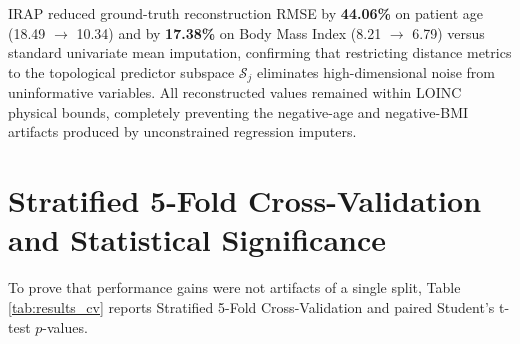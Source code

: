 \documentclass[MTech]{ugthesis}
\begin{document}
\begin{table}[htpb]
\small
\centering
\renewcommand{\arraystretch}{1.3}
\caption{Imputation fidelity evaluation measuring ground-truth reconstruction RMSE.}
\label{tab:results_imputation}
\end{table}

IRAP reduced ground-truth reconstruction RMSE by \textbf{44.06\%} on patient age (18.49 $\to$ 10.34) and by \textbf{17.38\%} on Body Mass Index (8.21 $\to$ 6.79) versus standard univariate mean imputation, confirming that restricting distance metrics to the topological predictor subspace $\mathcal{S}_j$ eliminates high-dimensional noise from uninformative variables. All reconstructed values remained within LOINC physical bounds, completely preventing the negative-age and negative-BMI artifacts produced by unconstrained regression imputers.

\section{Stratified 5-Fold Cross-Validation and Statistical Significance}
To prove that performance gains were not artifacts of a single split, Table \ref{tab:results_cv} reports Stratified 5-Fold Cross-Validation and paired Student's t-test $p$-values.

\begin{table}[htpb]
\small
\centering
\renewcommand{\arraystretch}{1.3}
\caption{Stratified 5-Fold Cross-Validation and Paired t-Test Significance ($N_{splits}=5$).}
\label{tab:results_cv}
\end{table}
\end{document}
